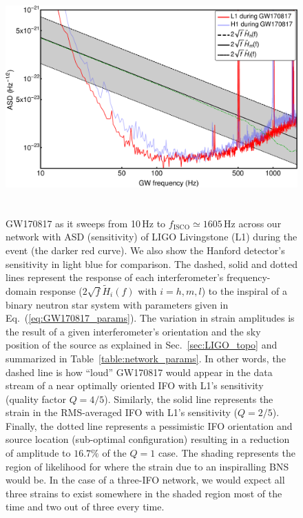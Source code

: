 \documentclass[amsmath,amssymb,aps,floats,amsfonts,notitlepage,superscriptaddress,eqsecnum,nofootinbib,10pt]{revtex4-1}
\begin{document}
\begin{figure}[h!]
\includegraphics[height=9cm]{../Figures/GW170817_strains.pdf}
\caption{GW170817 as it sweeps from 10\,Hz to $f_\text{ISCO} \simeq1605\,$Hz across our network with ASD (sensitivity) of 
LIGO Livingstone (L1) during the event (the darker red curve).
We also show the Hanford detector's sensitivity in light blue for comparison. The dashed, solid and dotted lines represent the 
response of each interferometer's frequency-domain response ($2\sqrt{f} \tilde{H}_i(f)$ with $i=h,m,l$) to the inspiral of
a binary neutron star system with parameters given in Eq.~(\ref{eq:GW170817_params}).
The variation in strain amplitudes is the result of a given interferometer's orientation and the sky position of the source 
as explained in Sec.~\ref{sec:LIGO_topo} and summarized in Table~\ref{table:network_params}.
In other words, the dashed line is how ``loud'' GW170817 would appear in the data stream of a near optimally oriented IFO with L1's sensitivity
(quality factor $Q=4/5$). Similarly, the solid line represents the strain in %
the RMS-averaged IFO with L1's sensitivity ($Q=2/5$). %
Finally, the dotted line represents a pessimistic IFO orientation and source location (sub-optimal configuration)
resulting in a reduction of amplitude to $ 16.7\%$ of the $Q=1$ case. 
The shading represents the region of likelihood for where the strain due to an inspiralling BNS would be. In the case of a three-IFO
network, we would expect all three strains to exist somewhere in the shaded region most of the time and two out of three every time.
}
\end{figure}
\end{document}
